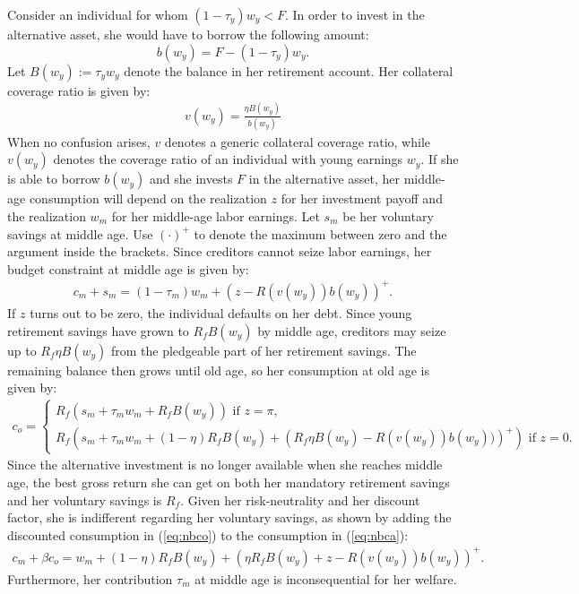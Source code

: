 \documentclass[draft,pdftex,nolinenumbers,noinfoline]{article}
\theoremstyle{plain}
\begin{document}
Consider an individual for whom $(1-\tau_y)w_y < F$. In order to invest in the alternative asset, she would have to borrow the following amount: 
\begin{equation}\label{eq:nborrow}
b(w_y) = F-(1-\tau_y)w_y. 
\end{equation}
Let $B(w_y):=\tau_y w_y$ denote the balance in her retirement account. Her collateral coverage ratio is given by:
\begin{align}\label{eq:ncoverage}
v(w_y) = \frac{\eta B(w_y)}{b(w_y)}
\end{align}
When no confusion arises, $v$ denotes a generic collateral coverage ratio, while $v(w_y)$ denotes the coverage ratio of an individual with young earnings $w_y$.
If she is able to borrow $b(w_y)$ and she invests $F$ in the alternative asset, her middle-age consumption will depend on the realization $z$ for her investment payoff and the realization $w_m$ for her middle-age labor earnings. Let $s_m$ be her voluntary savings at middle age. Use $(\cdot)^+$ to denote the maximum between zero and the argument inside the brackets. Since creditors cannot seize labor earnings, her budget constraint at middle age is given by:  
\begin{align}\label{eq:nbca}
c_m + s_m = (1-\tau_m)w_m + \left(z  - R(v(w_y))b(w_y)\right)^+.
\end{align}
If $z$ turns out to be zero, the individual defaults on her debt. Since young retirement savings have grown to $R_fB(w_y)$ by middle age, creditors may seize up to $R_f\eta B(w_y)$ from the pledgeable part of her retirement savings. The remaining balance then grows until old age, so her consumption at old age is given by: \begin{align}\label{eq:nbco}
c_o  = \begin{cases}
R_f\left(
s_m + \tau_m w_m +  R_f B(w_y) 
 \right) \text{ if }  z=\pi, \\
R_f\left(
s_m + \tau_m w_m + (1-\eta) R_f B(w_y) 
+ \left(
  R_f\eta B(w_y) - R(v(w_y))b(w_y))
\right)^+
\right) \text{ if }  z=0.
\end{cases}
\end{align}
Since the alternative investment is no longer available when she reaches middle age, the best gross return she can get on both her mandatory retirement savings and her voluntary savings is $R_f$. Given her risk-neutrality and her discount factor, she is indifferent regarding her voluntary savings, as shown by adding the discounted consumption in (\ref{eq:nbco}) to the consumption in (\ref{eq:nbca}):
\begin{align}\label{eq:npvc}
c_m + \beta c_o =   w_m   + (1-\eta) R_f B(w_y) + (\eta R_f B(w_y) + z    - R(v(w_y))b(w_y))^+. 
\end{align}
Furthermore, her contribution $\tau_m$ at middle age is inconsequential for her welfare. 
\end{document}
